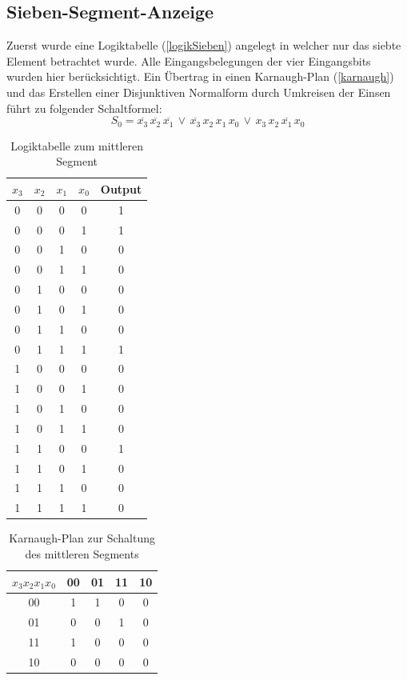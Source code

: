 \documentclass[11pt, a4paper]{article}
\begin{document}
\subsection*{Sieben-Segment-Anzeige}
Zuerst wurde eine Logiktabelle (\autoref{logikSieben}) angelegt in welcher nur das siebte Element betrachtet wurde. Alle Eingangsbelegungen der vier Eingangsbits wurden hier berücksichtigt. Ein Übertrag in einen Karnaugh-Plan (\autoref{karnaugh}) und das Erstellen einer Disjunktiven Normalform durch Umkreisen der Einsen führt zu folgender Schaltformel:
$$S_0 = \overline{x_3}\,\overline{x_2}\,\overline{x_1}\,\lor\,\overline{x_3}\,x_2\,x_1\,x_0\,\lor\,x_3\,x_2\,\overline{x_1}\,x_0$$
\begin{table}[H]
	\center
	\begin{tabular}{c|c|c|c||c}
	$x_3$ &  $x_2$ & $x_1$ & $x_0$ & Output	\\ \hline
	0 & 0 & 0 & 0 & 1 \\ \hline	
	0 & 0 & 0 & 1 & 1 \\ \hline
	0 & 0 & 1 & 0 & 0 \\ \hline
	0 & 0 & 1 & 1 & 0 \\ \hline
	0 & 1 & 0 & 0 & 0 \\ \hline
	0 & 1 & 0 & 1 & 0 \\ \hline
	0 & 1 & 1 & 0 & 0 \\ \hline
	0 & 1 & 1 & 1 & 1 \\ \hline
	1 & 0 & 0 & 0 & 0 \\ \hline	
	1 & 0 & 0 & 1 & 0 \\ \hline	
	1 & 0 & 1 & 0 & 0 \\ \hline	
	1 & 0 & 1 & 1 & 0 \\ \hline	
	1 & 1 & 0 & 0 & 1 \\ \hline	
	1 & 1 & 0 & 1 & 0 \\ \hline	
	1 & 1 & 1 & 0 & 0 \\ \hline	
	1 & 1 & 1 & 1 & 0 \\ \hline	
	\end{tabular}
	\caption{Logiktabelle zum mittleren Segment}
	\label{logikSieben}
\end{table}
\begin{table}[H]
	\center
	\begin{tabular}{c||c|c|c|c}
	$x_3 x_2 x_1 x_0$ 	& 00 & 01 & 11 & 10	\\ \hline \hline
	00 & 1 & 1 & 0 & 0 \\ \hline
	01 & 0 & 0 & 1 & 0 \\ \hline
	11 & 1 & 0 & 0 & 0 \\ \hline
	10 & 0 & 0 & 0 & 0 \\ \hline
	\end{tabular}
	\caption{Karnaugh-Plan zur Schaltung des mittleren Segments}
	\label{karnaugh}
\end{table}
\end{document}

